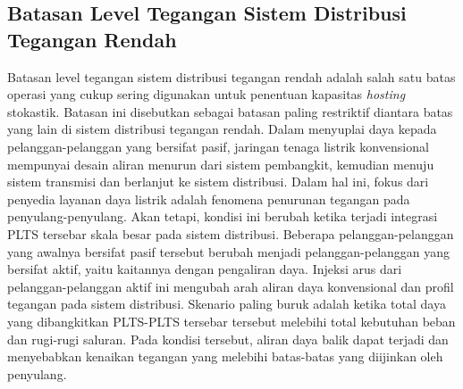 {\subsection{Batasan Level Tegangan Sistem Distribusi Tegangan Rendah}
Batasan level tegangan sistem distribusi tegangan rendah adalah salah satu batas operasi yang cukup sering digunakan untuk penentuan kapasitas \textit{hosting} stokastik\cite{Santos-Martin2016,Silva2016,Navarro-Espinosa2016,Arshad2017,Baptista2019,Epri2012,Dubey2015,Dubey2017,Ding2017,Bollen2017,Torquato2018,Deakin2019,Vergara2020}. Batasan ini disebutkan sebagai batasan paling restriktif diantara batas yang lain di sistem distribusi tegangan rendah. Dalam menyuplai daya kepada pelanggan-pelanggan yang bersifat pasif, jaringan tenaga listrik konvensional mempunyai desain aliran menurun dari sistem pembangkit, kemudian menuju sistem transmisi dan berlanjut ke sistem distribusi. Dalam hal ini, fokus dari penyedia layanan daya listrik adalah fenomena penurunan tegangan pada penyulang-penyulang. Akan tetapi, kondisi ini berubah ketika terjadi integrasi PLTS tersebar skala besar pada sistem distribusi. Beberapa pelanggan-pelanggan yang awalnya bersifat pasif tersebut berubah menjadi pelanggan-pelanggan yang bersifat aktif, yaitu kaitannya dengan pengaliran daya. Injeksi arus dari pelanggan-pelanggan aktif ini mengubah arah aliran daya konvensional dan profil tegangan pada sistem distribusi. Skenario paling buruk adalah ketika total daya yang dibangkitkan PLTS-PLTS tersebar tersebut melebihi total kebutuhan beban dan rugi-rugi saluran. Pada kondisi tersebut, aliran daya balik dapat terjadi dan menyebabkan kenaikan tegangan yang melebihi batas-batas yang diijinkan oleh penyulang.

}
